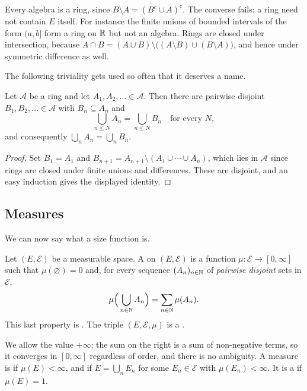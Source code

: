 \documentclass[a4paper]{scrartcl}
\newcommand{\cA}{\mathcal{A}}
\newcommand{\cE}{\mathcal{E}}
\begin{document}
\begin{remark}
	Every algebra is a ring, since $B \setminus A = (B^c \cup A)^c$. The converse fails: a ring need not contain $E$ itself. For instance the finite unions of bounded intervals of the form $(a,b]$ form a ring on $\mathbb{R}$ but not an algebra. Rings are closed under intersection, because $A \cap B = (A \cup B) \setminus \big( (A\setminus B) \cup (B \setminus A)\big)$, and hence under symmetric difference as well.
\end{remark}

The following triviality gets used so often that it deserves a name.

\begin{proposition}[Disjointification]\label{prop:disjointify}
	Let $\cA$ be a ring and let $A_1, A_2, \dots \in \cA$. Then there are pairwise disjoint $B_1, B_2, \dots \in \cA$ with $B_n \subseteq A_n$ and
	$$
	\bigcup_{n \leq N} A_n = \bigcup_{n \leq N} B_n \quad \text{for every } N,
	$$
	and consequently $\bigcup_n A_n = \bigcup_n B_n$.
\end{proposition}
\begin{proof}
	Set $B_1 = A_1$ and $B_{n+1} = A_{n+1} \setminus (A_1 \cup \cdots \cup A_n)$, which lies in $\cA$ since rings are closed under finite unions and differences. These are disjoint, and an easy induction gives the displayed identity.
\end{proof}

\subsection{Measures}

We can now say what a size function is.

\begin{definition}[Measure]
	Let $(E, \cE)$ be a measurable space. A  on $(E, \cE)$ is a function $\mu : \cE \to [0, \infty]$ such that $\mu(\varnothing) = 0$ and, for every sequence $(A_n)_{n\in\mathbb{N}}$ of \emph{pairwise disjoint} sets in $\cE$,
	$$
	\mu\Big( \bigcup_{n \in \mathbb{N}} A_n \Big) = \sum_{n \in \mathbb{N}} \mu(A_n).
	$$
	This last property is . The triple $(E, \cE, \mu)$ is a .
\end{definition}

We allow the value $+\infty$; the sum on the right is a sum of non-negative terms, so it converges in $[0,\infty]$ regardless of order, and there is no ambiguity. A measure is  if $\mu(E) < \infty$, and  if $E = \bigcup_n E_n$ for some $E_n \in \cE$ with $\mu(E_n) < \infty$. It is a  if $\mu(E) = 1$.
\end{document}
